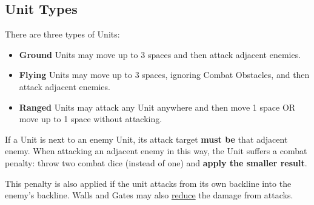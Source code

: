 \begin{multicols}{2}
\subsection*{\hypertarget{Unittype}{Unit Types}}
There are three types of Units:
\begin{itemize}
  \item \textbf{Ground}  Units may move up to 3 spaces and then attack adjacent enemies.
  \item \textbf{Flying}  Units may move up to 3 spaces, ignoring Combat Obstacles, and then attack adjacent enemies.
  \item \textbf{Ranged}  Units may attack any Unit anywhere and then move 1 space OR move up to 1 space without attacking.
\end{itemize}
If a  Unit is next to an enemy Unit, its attack target \textbf{must be} that adjacent enemy.
When attacking an adjacent enemy in this way, the  Unit suffers a combat penalty: throw two combat dice (instead of one) and \textbf{apply the smaller result}.\par
This penalty is also applied if the  unit attacks from its own backline into the enemy's backline.
Walls and Gates may also \hyperlink{Walls}{reduce} the damage from   attacks.


\end{multicols}
